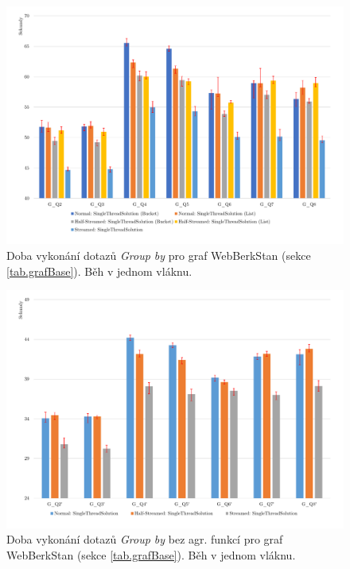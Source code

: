 \begin{figure}[!htp]
\includegraphics[width=\linewidth]{../img/webberkstanGroupByST.pdf}\centering
\caption{Doba vykonání dotazů \textit{Group by} pro graf WebBerkStan (sekce \ref{tab.grafBase}). Běh v jednom vláknu.}
\label{figure.webberkstanGroupByST}
\end{figure}
\begin{figure}[!htp]
\includegraphics[width=\linewidth]{../img/webberkstanGroupBySTNoAgg.pdf}\centering
\caption{Doba vykonání dotazů \textit{Group by} bez agr. funkcí pro graf WebBerkStan (sekce \ref{tab.grafBase}). Běh v jednom vláknu.}
\label{figure.webberkstanGroupBySTNoAgg}
\end{figure}

